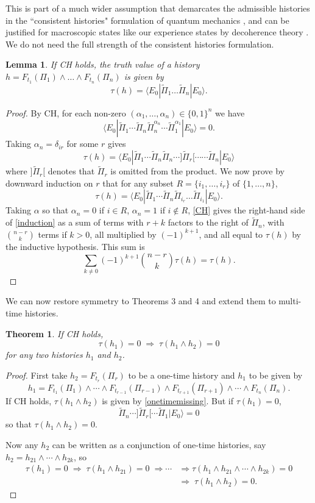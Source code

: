 \documentclass[12pt,reqno]{article}
\renewcommand{\(}{\left(}
\renewcommand{\)}{\right)}
\newcommand{\<}{\langle}
\renewcommand{\>}{\rangle}
\newcommand{\impl}{\Longrightarrow}
\newcommand{\be}{\begin{equation}}
\newcommand{\ee}{\end{equation}}
\newcommand{\Pii}{\widetilde{\Pi}}
\theoremstyle{plain} %
\newtheorem{thm}{Theorem}
\newtheorem{lemma}{Lemma}
\begin{document}
This is part of a much wider assumption that demarcates the admissible histories in the ``consistent histories" formulation of quantum mechanics \cite{Griffiths:book}, and can be justified for macroscopic states like our experience states by decoherence theory \cite{Wallace:multiverse}. We do not need the full strength of the consistent histories formulation.

\begin{lemma}\label{PiiPii} If CH holds, the truth value of a history $h = F_{t_1}(\Pi_1)\land\ldots\land F_{t_n}(\Pi_n)$ is given by
\be\label{eqPiiPii}
\tau(h) = \<E_0|\Pii_1\ldots \Pii_n|E_0\>.
\ee
\end{lemma}
\begin{proof} By CH, for each non-zero $(\alpha_1,\ldots , \alpha_n) \in \{0,1\}^n$ we have
\be\label{CH}
\<E_0|\Pii_1\cdots\Pii_n\Pii_n^{\alpha_n}\cdots\Pii_1^{\alpha_1}|E_0\> = 0.
\ee
Taking $\alpha_n = \delta_{ir}$ for some $r$ gives
\be\label{onetimemissing}
\tau(h) = \<E_0|\Pii_1\cdots\Pii_n\Pii_n\cdots ]\Pii_r[\cdots \cdots \Pii_n|E_0\>
\ee
where $]\Pii_r[$ denotes that $\Pii_r$ is omitted from the product. We now prove by downward induction on $r$ that for any subset $R = \{i_1,\ldots ,i_r\}$ of $\{1,\ldots ,n\}$,
\be\label{induction}
\tau(h) = \<E_0|\Pii_1\cdots\Pii_n\Pii_{i_r}\ldots\Pii_{i_1}|E_0\>.
\ee
Taking $\alpha$ so that $\alpha_n = 0$ if $i\in R$, $\alpha_n = 1$ if $i\notin R$, \eqref{CH} gives the right-hand side of \eqref{induction} as a sum of terms with $r+k$ factors to the right of $\Pii_n$, with $\binom{n-r}{k}$ terms if $k>0$, all multiplied by $(-1)^{k+1}$, and all equal to $\tau(h)$ by the inductive hypothesis. This sum is
\[
\sum_{k\neq0}(-1)^{k+1}\binom{n-r}{k}\tau(h) = \tau(h).
\]
 \end{proof}  

We can now restore symmetry to Theorems 3 and 4 and extend them to multi-time histories.

\begin{thm} If CH holds,
\[
\tau(h_1) = 0  \; \impl \; \tau(h_1\land h_2) = 0
\]
for any two histories $h_1$ and $h_2$.
\end{thm}
\begin{proof}
First take $h_2 = F_{t_r}(\Pi_r)$ to be a one-time history and $h_1$ to be given by 
\[
h_1 = F_{t_1}(\Pi_1)\land\cdots\land F_{t_{r-1}}(\Pi_{r-1})\land F_{t_{r+1}}(\Pi_{r+1})\land\cdots \land F_{t_n}(\Pi_n).
\]
If CH holds, $\tau(h_1\land h_2)$ is given by \eqref{onetimemissing}. But if $\tau(h_1) = 0$,
\[
\Pii_n\cdots ]\Pii_r[ \cdots \Pii_1|E_0\> = 0
\]
so that $\tau(h_1\land h_2) = 0$.

Now any $h_2$ can be written as a conjunction of one-time histories, say $h_2 = h_{21}\land\cdots\land h_{2k}$, so
\begin{align*}
\tau(h_1) = 0\; \impl\; \tau(h_1\land h_{21}) = 0\; \impl \cdots &\impl \tau(h_1\land h_{21}\land\cdots\land h_{2k}) = 0\\
 &\impl \; \tau(h_1\land h_2) = 0.
\end{align*}
\end{proof}
\end{document}
